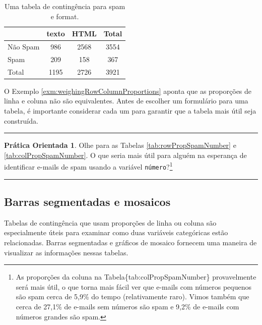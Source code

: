 \documentclass[
]{book}
\theoremstyle{definition}
\theoremstyle{definition}
\theoremstyle{definition}
\newtheorem{exercise}{Prática Orientada}[chapter]
\theoremstyle{definition}
\theoremstyle{remark}
\begin{document}
\begin{table}

\caption{\label{tab:emailSpamHTMLTableTotals}Uma tabela de contingência para spam e format.}
\centering
\begin{tabular}[t]{l|c|c|c}
\hline
  & texto & HTML & Total\\
\hline
Não Spam & 986 & 2568 & 3554\\
\hline
Spam & 209 & 158 & 367\\
\hline
Total & 1195 & 2726 & 3921\\
\hline
\end{tabular}
\end{table}

O Exemplo \ref{exm:weighingRowColumnProportions} aponta que as proporções de linha e coluna não são equivalentes. Antes de escolher um formulário para uma tabela, é importante considerar cada um para garantir que a tabela mais útil seja construída.

\begin{center}\rule{0.5\linewidth}{0.5pt}\end{center}

\begin{exercise}
\protect\hypertarget{exr:unnamed-chunk-37}{}{\label{exr:unnamed-chunk-37} }Olhe para as Tabelas \ref{tab:rowPropSpamNumber} e \ref{tab:colPropSpamNumber}. O que seria mais útil para alguém na esperança de identificar e-mails de spam usando a variável \texttt{número}?\footnote{As proporções da coluna na Tabela\textasciitilde@ref\{tab:colPropSpamNumber\} provavelmente será mais útil, o que torna mais fácil ver que e-mails com números pequenos são spam cerca de 5,9\% do tempo (relativamente raro). Vimos também que cerca de 27,1\% de e-mails sem números são spam e 9,2\% de e-mails com números grandes são spam.}
\end{exercise}

\begin{center}\rule{0.5\linewidth}{0.5pt}\end{center}

\hypertarget{segmentedBarPlotsAndIndependence}{%
\subsection{Barras segmentadas e mosaicos}\label{segmentedBarPlotsAndIndependence}}

Tabelas de contingência que usam proporções de linha ou coluna são especialmente úteis para examinar como duas variáveis categóricas estão relacionadas. Barras segmentadas e gráficos de mosaico fornecem uma maneira de visualizar as informações nessas tabelas.
\end{document}
